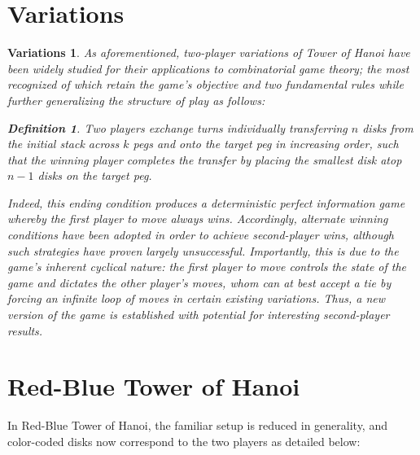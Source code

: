 \documentclass[12pt,reqno]{amsart}
\theoremstyle{plain}
\newtheorem{definition}{Definition}
\newtheorem*{variations}{Variations}
\begin{document}
\section{Variations}
\begin{variations} \normalfont
As aforementioned, two-player variations of Tower of Hanoi have been widely studied for their applications to combinatorial game theory; the most recognized of which retain the game’s objective and two fundamental rules while further generalizing the structure of play as follows:

\begin{definition}
Two players exchange turns individually transferring $n$ disks from the initial stack across $k$ pegs and onto the target peg in increasing order, such that the winning player completes the transfer by placing the smallest disk atop $n-1$ disks on the target peg. 
\end{definition}
Indeed, this ending condition produces a deterministic perfect information game whereby the first player to move always wins. Accordingly, alternate winning conditions have been adopted in order to achieve second-player wins, although such strategies have proven largely unsuccessful. Importantly, this is due to the game’s inherent cyclical nature: the first player to move controls the state of the game and dictates the other player’s moves, whom can at best accept a tie by forcing an infinite loop of moves in certain existing variations. Thus, a new version of the game is established with potential for interesting second-player results.

\end{variations}
\section{Red-Blue Tower of Hanoi}
In Red-Blue Tower of Hanoi, the familiar setup is reduced in generality, and color-coded disks now correspond to the two players as detailed below:
\end{document}
